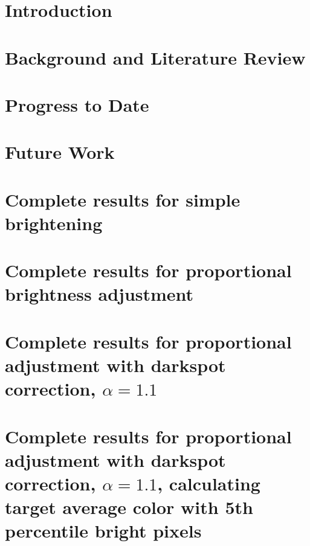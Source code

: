 \documentclass[12pt, a4paper]{article}
\begin{document}
\tableofcontents
\pagebreak

\listoffigures
\listoftables
\pagebreak

\renewcommand{\nomname}{List of Symbols}
\printnomenclature
\pagebreak

\section{Introduction}

\pagebreak

\section{Background and Literature Review}

\pagebreak

\section{Progress to Date}

\pagebreak

\section{Future Work}
\pagebreak



\pagebreak

\appendix

\section{Complete results for simple brightening}\label{app:boost}

\pagebreak

\section{Complete results for proportional brightness adjustment}\label{app:prop}

\pagebreak

\section{Complete results for proportional adjustment with darkspot correction, $\alpha = 1.1$}\label{app:prop_corr_a1p1}

\pagebreak

\section{Complete results for proportional adjustment with darkspot correction, $\alpha = 1.1$, calculating target average color with 5th percentile bright pixels}\label{app:prop_corr_ave_a1p1_perc5}

\end{document}

